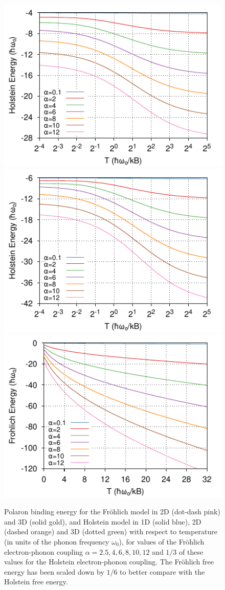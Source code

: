 \begin{figure}[!tbp]
    \includegraphics[width=.49\textwidth]{figures/holstein-2d-energy-temp-00625to32-COLOUR.pdf}
    \includegraphics[width=.49\textwidth]{figures/holstein-3d-energy-temp-00625to32-COLOUR.pdf}
    \includegraphics[width=.49\textwidth]{chapters/literature/figures/frohlich-3d-energy-temp-00625to32-COLOUR.pdf}
    \caption{Polaron binding energy for the Fr\"ohlich model in 2D (dot-dash pink) and 3D (solid gold), and Holstein model in 1D (solid blue), 2D (dashed orange) and 3D (dotted green) with respect to temperature (in units of the phonon frequency $\omega_0$), for values of the Fr\"ohlich electron-phonon coupling $\alpha = 2.5, 4, 6, 8, 10, 12$ and $1/3$ of these values for the Holstein electron-phonon coupling. The Fr\"ohlich free energy has been scaled down by $1/6$ to better compare with the Holstein free energy.}
    \label{fig:energy_temp}
\end{figure}

